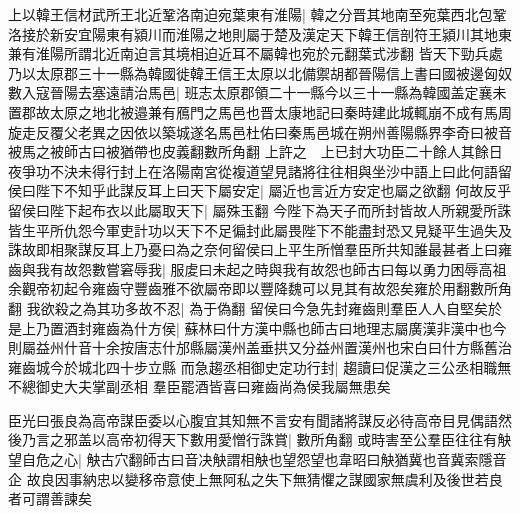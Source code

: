 上以韓王信材武所王北近鞏洛南迫宛葉東有淮陽|{
	韓之分晋其地南至宛葉西北包鞏洛接於新安宜陽東有潁川而淮陽之地則屬于楚及漢定天下韓王信剖符王潁川其地東兼有淮陽所謂北近南迫言其境相迫近耳不屬韓也宛於元翻葉式涉翻}
皆天下勁兵處乃以太原郡三十一縣為韓國徙韓王信王太原以北備禦胡都晉陽信上書曰國被邊匈奴數入寇晉陽去塞遠請治馬邑|{
	班志太原郡領二十一縣今以三十一縣為韓國盖定襄未置郡故太原之地北被邉兼有鴈門之馬邑也晋太康地記曰秦時建此城輒崩不成有馬周旋走反覆父老異之因依以築城遂名馬邑杜佑曰秦馬邑城在朔州善陽縣界李奇曰被音被馬之被師古曰被猶帶也皮義翻數所角翻}
上許之　上已封大功臣二十餘人其餘日夜爭功不決未得行封上在洛陽南宮從複道望見諸將往往相與坐沙中語上曰此何語留侯曰陛下不知乎此謀反耳上曰天下屬安定|{
	屬近也言近方安定也屬之欲翻}
何故反乎留侯曰陛下起布衣以此屬取天下|{
	屬殊玉翻}
今陛下為天子而所封皆故人所親愛所誅皆生平所仇怨今軍吏計功以天下不足徧封此屬畏陛下不能盡封恐又見疑平生過失及誅故即相聚謀反耳上乃憂曰為之奈何留侯曰上平生所憎羣臣所共知誰最甚者上曰雍齒與我有故怨數嘗窘辱我|{
	服䖍曰未起之時與我有故怨也師古曰每以勇力困辱高祖余觀帝初起令雍齒守豐齒雅不欲屬帝即以豐降魏可以見其有故怨矣雍於用翻數所角翻}
我欲殺之為其功多故不忍|{
	為于偽翻}
留侯曰今急先封雍齒則羣臣人人自堅矣於是上乃置酒封雍齒為什方侯|{
	蘇林曰什方漢中縣也師古曰地理志屬廣漢非漢中也今則屬益州什音十余按唐志什邡縣屬漢州盖垂拱又分益州置漢州也宋白曰什方縣舊治雍齒城今於城北四十步立縣}
而急趨丞相御史定功行封|{
	趨讀曰促漢之三公丞相職無不總御史大夫掌副丞相}
羣臣罷酒皆喜曰雍齒尚為侯我屬無患矣

臣光曰張良為高帝謀臣委以心腹宜其知無不言安有聞諸將謀反必待高帝目見偶語然後乃言之邪盖以高帝初得天下數用愛憎行誅賞|{
	數所角翻}
或時害至公羣臣往往有觖望自危之心|{
	觖古穴翻師古曰音决觖謂相觖也望怨望也韋昭曰觖猶冀也音冀索隱音企}
故良因事納忠以變移帝意使上無阿私之失下無猜懼之謀國家無虞利及後世若良者可謂善諫矣

